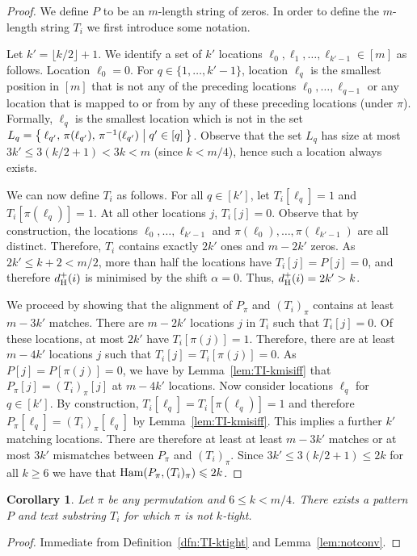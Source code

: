 \documentclass[11pt]{article}
\renewcommand{\geq}{\geqslant}
\renewcommand{\leq}{\leqslant}
\newcommand{\ham}{\ensuremath{\textup{Ham}}}
\newcommand{\DsHam}{\ensuremath{d_\textup{H}^+}}
\newcommand{\dHam}{\DsHam}
\theoremstyle{plain}
\newtheorem{corollary}[theorem]{Corollary}
\theoremstyle{definition}
\begin{document}
\begin{proof}
    We define $P$ to be an $m$-length string of zeros. In order to define the $m$-length string $T_i$ we first introduce some notation.

    Let $k'=\lfloor k/2 \rfloor +1$. We identify a set of $k'$ locations $\ell_0,\ell_1,\ldots, \ell_{k'-1}\in [m]$ as follows. Location $\ell_0=0$. For $q\in\{1,\dots,k'-1\}$, location $\ell_q$ is the smallest position in $[m]$ that is not any of the preceding locations $\ell_0,\dots,\ell_{q-1}$ or any location that is mapped to or from by any of these preceding locations (under $\pi$). Formally, $\ell_q$ is the smallest location which is not in the set $L_q=\Set{ \ell_{q'},\, \pi(\ell_{q'}),\, \pi^{-1}(\ell_{q'}) | q'\in [q]}$. Observe that the set $L_q$ has size at most $3k' \leq 3(k/2+1) < 3k < m$ (since $k<m/4$), hence such a location always exists.

    We can now define $T_i$ as follows. For all $q\in [k']$, let $T_i[\ell_q]=1$ and $T_i[\pi(\ell_q)]=1$. At all other locations $j$, $T_i[j]=0$. Observe that by construction, the locations $\ell_0,\ldots, \ell_{k'-1}$ and $\pi(\ell_0),\ldots, \pi(\ell_{k'-1})$ are all distinct. Therefore, $T_i$ contains exactly $2k'$ ones and $m-2k'$ zeros. As $2k'\leq k+2< m/2$, more than half the locations have $T_i[j]=P[j]=0$, and therefore $\dHam(i)$ is minimised by the shift $\alpha=0$. Thus, $\dHam(i) = 2k' > k$.

    We proceed by showing that the alignment of $P_\pi$ and $(T_i)_\pi$ contains at least $m-3k'$ matches. There are $m-2k'$ locations $j$ in $T_i$ such that $T_i[j]=0$. Of these locations, at most $2k'$ have $T_i[\pi(j)]=1$. Therefore, there are at least $m-4k'$ locations $j$ such that $T_i[j]=T_i[\pi(j)]=0$. As $P[j]=P[\pi(j)]=0$, we have by Lemma~\ref{lem:TI-kmisiff} that $P_\pi[j]=(T_i)_\pi[j]$ at $m-4k'$ locations. Now consider locations $\ell_q$ for $q\in [k']$. By construction, $T_i[\ell_q]=T_i[\pi(\ell_q)]=1$ and therefore $P_\pi[\ell_q]=(T_i)_\pi[\ell_q]$ by Lemma~\ref{lem:TI-kmisiff}. This implies a further $k'$ matching locations. There are therefore at least at least $m-3k'$ matches or at most $3k'$ mismatches between $P_\pi$ and $(T_i)_\pi$. Since $3k' \leq 3(k/2 + 1) \leq 2k$ for all $k \geq 6$ we have that $\ham(P_\pi,(T_i)_\pi) \leq 2k$.
\end{proof}

\begin{corollary}
    \label{cor:notktight}
    Let $\pi$ be any permutation and $6 \leq k < m/4$. There exists a pattern $P$ and text substring $T_i$ for which $\pi$ is not $k$-tight.
\end{corollary}
\begin{proof}
Immediate from Definition~\ref{dfn:TI-ktight} and Lemma~\ref{lem:notconv}.
\end{proof}
\end{document}
